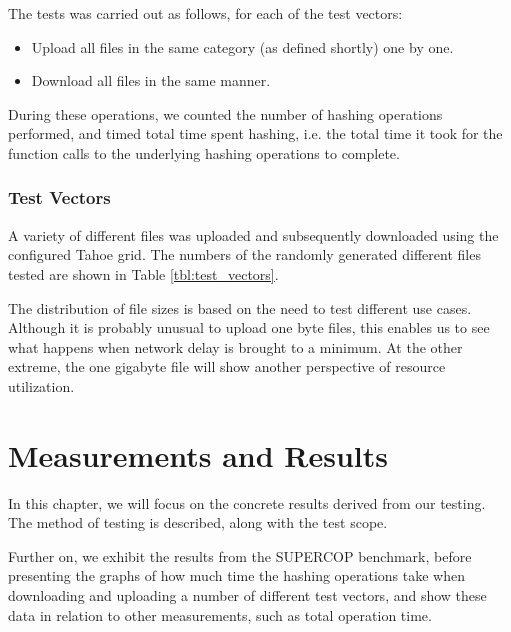 \documentclass[english,12pt,a4paper]{book}
\begin{document}
The tests was carried out as follows, for each of the test vectors:

\begin{itemize}
  \item Upload all files in the same category (as defined shortly) one by one.
  \item Download all files in the same manner.
\end{itemize}

During these operations, we counted the number of hashing operations performed,
and timed total time spent hashing, i.e. the total time it took for the function
calls to the underlying hashing operations to complete.

\subsection{Test Vectors}

A variety of different files was uploaded and subsequently downloaded using the
configured Tahoe grid. The numbers of the randomly generated different files
tested are shown in Table \ref{tbl:test_vectors}.



The distribution of file sizes is based on the need to test different use cases.
Although it is probably unusual to upload one byte files, this enables us to see
what happens when network delay is brought to a minimum. At the other extreme,
the one gigabyte file will show another perspective of resource utilization.


\chapter{Measurements and Results}


In this chapter, we will focus on the concrete results derived from our testing.
The method of testing is described, along with the test scope.

Further on, we exhibit the results from the \ac{SUPERCOP} benchmark, before
presenting the graphs of how much time the hashing operations take when
downloading and uploading a number of different test vectors, and show these
data in relation to other measurements, such as total operation time.
\end{document}
